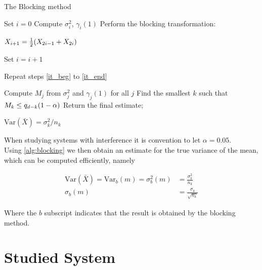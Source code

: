 \documentclass[aps,reprint,superscriptaddress,nofootinbib]{revtex4-2}
\newcommand{\Var}{\mathrm{Var}}     %
\begin{document}
    \begin{algorithm}
    \caption{The Blocking method}\label{alg:blocking}
    \begin{algorithmic}[1]
    \State Set $i=0$
    \State Compute $\sigma_i^2$, $\gamma_i(1)$  \label{it_beg}
    \State Perform the blocking transformation:
    
    $X_{i+1} = \frac{1}{2}\qty(X_{2i-1} + X_{2i})$
    
     \label{it_end}
    
        Set $i = i +1$
        
        Repeat steps \ref{it_beg} to \ref{it_end}
        
    \EndIf
    
    \State Compute $M_j$ from $\sigma_j^2$ and $\gamma_j(1)$ for all $j$
    \State Find the smallest $k$ such that $M_k \leq q_{d-k}\qty(1 - \alpha)$
    \State Return the final estimate;
    
    $\Var(\bar{X}) = \sigma_k^2 / n_k$
    \end{algorithmic}
    \end{algorithm}
    
    When studying systems with interference it is convention to let $\alpha = 0.05$. \\
    Using \ref{alg:blocking} we then obtain an estimate for the true variance of the mean, which can be computed efficiently, namely
    
    \begin{align*}
        \Var(\bar{X}) = \Var_b(m) = \sigma_b^2(m) &= \frac{\sigma_k^2}{n_k} \\
        \sigma_b(m) &= \frac{\sigma_k}{\sqrt{n_k}}
    \end{align*}
    
    Where the $b$ subscript indicates that the result is obtained by the blocking method.
    

\section*{Studied System}
\end{document}
